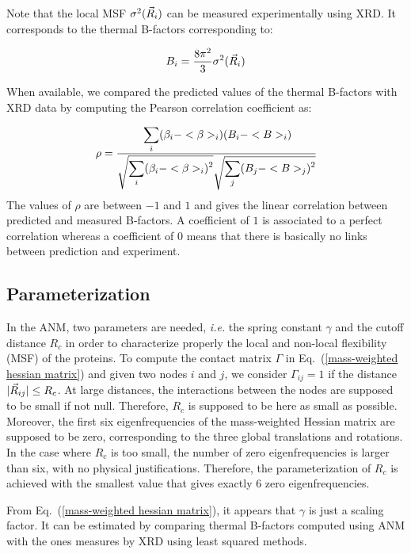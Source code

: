 Note that the local MSF $\sigma^2(\vec{R}_i)$ can be measured experimentally using XRD. It corresponds to the thermal B-factors corresponding to:

\begin{equation}
	B_i=\dfrac{8\pi^2}{3}\sigma^2(\vec{R}_i)
\end{equation}

When available, we compared the predicted values of the thermal B-factors with XRD data by computing the Pearson correlation coefficient as:

\begin{equation}
	\label{pearsonr}
	\rho = \cfrac{\displaystyle\sum_i (\beta_i - <\beta>_i)(B_i - <B>_i)}{\sqrt{\displaystyle\sum_i(\beta_i - <\beta>_i)^2}\sqrt{\displaystyle\sum_j(B_j - <B>_j)^2}}
\end{equation}
The values of $\rho$ are between $-1$ and $1$ and gives the linear correlation between predicted and measured B-factors. A coefficient of $1$ is associated to a perfect correlation whereas a coefficient of $0$ means that there is basically no links between prediction and experiment. 

\subsection{Parameterization}

In the ANM, two parameters are needed, \textit{i.e.} the spring constant $\gamma$ and the cutoff distance $R_c$ in order to characterize properly the local and non-local flexibility (MSF) of the proteins. To compute the contact matrix $\Gamma$ in Eq.~(\ref{mass-weighted hessian matrix}) and given two nodes $i$ and $j$, we consider $\Gamma_{ij} = 1$ if the distance $\vert\vec{R}_{ij}\vert \leq R_c$. At large distances, the interactions between the nodes are supposed to be small if not null. Therefore, $R_c$ is supposed to be here as small as possible. Moreover, the first six eigenfrequencies of the mass-weighted Hessian matrix are supposed to be zero, corresponding to the three global translations and rotations. In the case where $R_c$ is too small, the number of zero eigenfrequencies is larger than six, with no physical justifications. Therefore, the parameterization of $R_c$ is achieved with the smallest value that gives exactly $6$ zero eigenfrequencies. 

\noindent From Eq.~(\ref{mass-weighted hessian matrix}), it appears that  $\gamma$ is just a scaling factor. It can be estimated by comparing thermal B-factors computed using ANM with the ones measures by XRD  using least squared methods.

